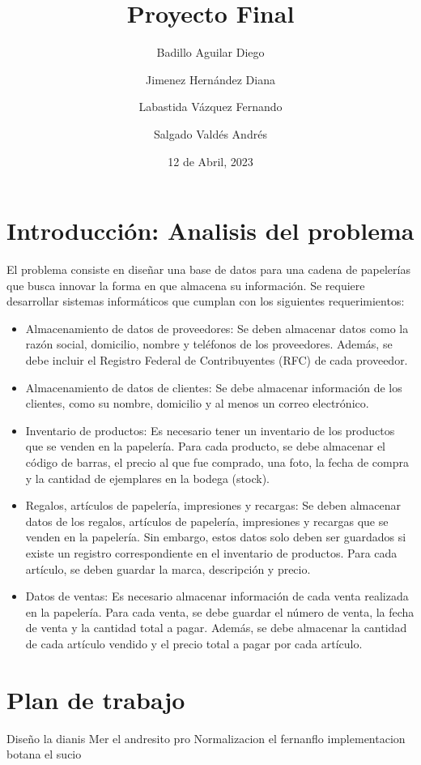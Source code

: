 \documentclass{article}
\title{Proyecto Final}
\author{Badillo Aguilar Diego \and Jimenez Hernández Diana \and Labastida Vázquez Fernando \and Salgado Valdés Andrés}
\date{12 de Abril, 2023}
\begin{document}
\maketitle

\section*{Introducción: Analisis del problema}
El problema consiste en diseñar una base de datos para una cadena de papelerías que busca innovar la forma en que almacena su información. Se requiere desarrollar sistemas informáticos que cumplan con los siguientes requerimientos:
\begin{itemize}
\item Almacenamiento de datos de proveedores: Se deben almacenar datos como la razón social, domicilio, nombre y teléfonos de los proveedores. Además, se debe incluir el Registro Federal de Contribuyentes (RFC) de cada proveedor.

\item Almacenamiento de datos de clientes: Se debe almacenar información de los clientes, como su nombre, domicilio y al menos un correo electrónico.

\item Inventario de productos: Es necesario tener un inventario de los productos que se venden en la papelería. Para cada producto, se debe almacenar el código de barras, el precio al que fue comprado, una foto, la fecha de compra y la cantidad de ejemplares en la bodega (stock).

\item Regalos, artículos de papelería, impresiones y recargas: Se deben almacenar datos de los regalos, artículos de papelería, impresiones y recargas que se venden en la papelería. Sin embargo, estos datos solo deben ser guardados si existe un registro correspondiente en el inventario de productos. Para cada artículo, se deben guardar la marca, descripción y precio.

\item Datos de ventas: Es necesario almacenar información de cada venta realizada en la papelería. Para cada venta, se debe guardar el número de venta, la fecha de venta y la cantidad total a pagar. Además, se debe almacenar la cantidad de cada artículo vendido y el precio total a pagar por cada artículo.
\end{itemize}




\section*{Plan de trabajo}
Diseño la dianis
Mer el andresito pro
Normalizacion el fernanflo
implementacion botana el sucio
\end{document}
